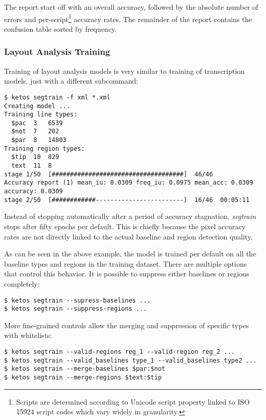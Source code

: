 The report start off with an overall accuracy, followed by the absolute number
of errors and per-script\footnote{Scripts are determined according to Unicode
script property linked to ISO 15924 script codes which vary widely in
granularity.} accuracy rates. The remainder of the report contains the
confusion table sorted by frequency.

\subsubsection{Layout Analysis Training}

Training of layout analysis models is very similar to training of transcription
models, just with a different subcommand:

\begin{verbatim}
$ ketos segtrain -f xml *.xml
Creating model ...
Training line types:
  $pac	3	6539
  $not	7	202
  $par	8	14803
Training region types:
  $tip	10	829
  text	11	8
stage 1/50  [####################################]  46/46          Accuracy report (1) mean_iu: 0.0309 freq_iu: 0.0975 mean_acc: 0.0309 accuracy: 0.0309
stage 2/50  [############------------------------]  16/46  00:05:11
\end{verbatim}

Instead of stopping automatically after a period of accuracy stagnation,
\emph{segtrain} stops after fifty epochs per default. This is chiefly because
the pixel accuracy rates are not directly linked to the actual baseline and
region detection quality.

As can be seen in the above example, the model is trained per default on all
the baseline types and regions in the training dataset. There are multiple
options that control this behavior. It is possible to suppress either baselines
or regions completely:

\begin{verbatim}
$ ketos segtrain --supress-baselines ...
$ ketos segtrain --suppress-regions ...
\end{verbatim}

More fine-grained controls allow the merging and suppression of specific types
with whitelists:

\begin{verbatim}
$ ketos segtrain --valid-regions reg_1 --valid-region reg_2 ...
$ ketos segtrain --valid_baselines type_1 --valid_baselines type2 ...
$ ketos segtrain --merge-baselines $par:$not
$ ketos segtrain --merge-regions $text:$tip
\end{verbatim}

